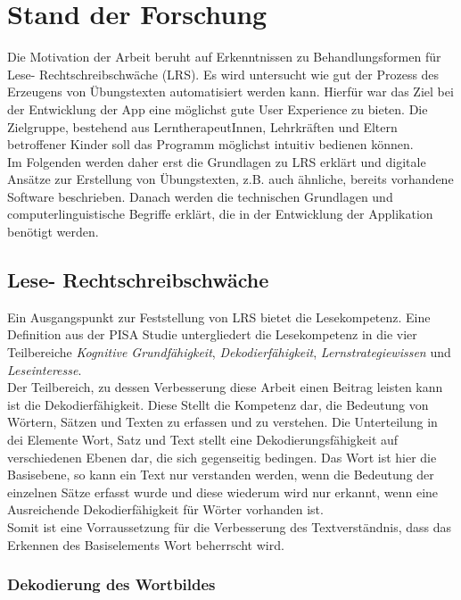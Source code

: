 
\chapter{Stand der Forschung}

Die Motivation der Arbeit beruht auf Erkenntnissen zu Behandlungsformen für Lese- Rechtschreibschwäche (LRS). Es wird untersucht wie gut der Prozess des Erzeugens von Übungstexten automatisiert werden kann. Hierfür war das Ziel bei der Entwicklung der App eine möglichst gute User Experience zu bieten. Die Zielgruppe, bestehend aus LerntherapeutInnen, Lehrkräften und Eltern betroffener Kinder soll das Programm möglichst intuitiv bedienen können.\\
Im Folgenden werden daher erst die Grundlagen zu LRS erklärt und digitale Ansätze zur Erstellung von Übungstexten, z.B. auch ähnliche, bereits vorhandene Software beschrieben. Danach werden die technischen Grundlagen und computerlinguistische Begriffe erklärt, die in der Entwicklung der Applikation benötigt werden.

\section{Lese- Rechtschreibschwäche}

Ein Ausgangspunkt zur Feststellung von LRS bietet die Lesekompetenz. Eine Definition aus der PISA Studie untergliedert die Lesekompetenz in die vier Teilbereiche \textit{Kognitive Grundfähigkeit}, \textit{Dekodierfähigkeit}, \textit{Lernstrategiewissen} und \textit{Leseinteresse}\cite{Schulte-Koerne2014}.\\
Der Teilbereich, zu dessen Verbesserung diese Arbeit einen Beitrag leisten kann ist die Dekodierfähigkeit. Diese Stellt die Kompetenz dar, die Bedeutung von Wörtern, Sätzen und Texten zu erfassen und zu verstehen. Die Unterteilung in dei Elemente Wort, Satz und Text stellt eine Dekodierungsfähigkeit auf verschiedenen Ebenen dar, die sich gegenseitig bedingen. Das Wort ist hier die Basisebene, so kann ein Text nur verstanden werden, wenn die Bedeutung der einzelnen Sätze erfasst wurde und diese wiederum wird nur erkannt, wenn eine Ausreichende Dekodierfähigkeit für Wörter vorhanden ist.\\
Somit ist eine Vorraussetzung für die Verbesserung des Textverständnis, dass das Erkennen des Basiselements Wort beherrscht wird.

\subsection{Dekodierung des Wortbildes}

